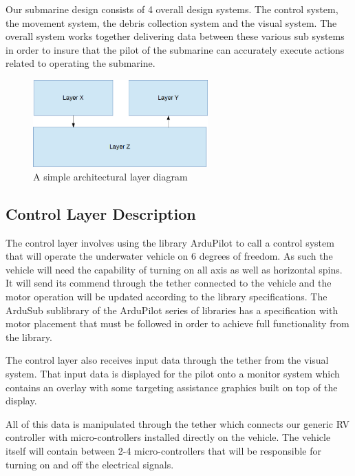 Our submarine design consists of 4 overall design systems. The control system, the movement system, the debris collection system and the visual system. The overall system works together delivering data between these various sub systems in order to insure that the pilot of the submarine can accurately execute actions related to operating the submarine.

\begin{figure}[h!]
	\centering
 	\includegraphics[width=0.60\textwidth]{images/layers}
 \caption{A simple architectural layer diagram}
\end{figure}

\subsection{Control Layer Description}
	The control layer involves using the library ArduPilot to call a control system that will operate the underwater vehicle on 6 degrees of freedom. As such the vehicle will need the capability of turning on all axis as well as horizontal spins. It will send its commend through the tether connected to the vehicle and the motor operation will be updated according to the library specifications. The ArduSub sublibrary of the ArduPilot series of libraries has a specification with motor placement that must be followed in order to achieve full functionality from the library.
	
	The control layer also receives input data through the tether from the visual system. That input data is displayed for the pilot onto a monitor system which contains an overlay with some targeting assistance graphics built on top of the display.
	
	All of this data is manipulated through the tether which connects our generic RV controller with micro-controllers installed directly on the vehicle. The vehicle itself will contain between 2-4 micro-controllers that will be responsible for turning on and off the electrical signals.

